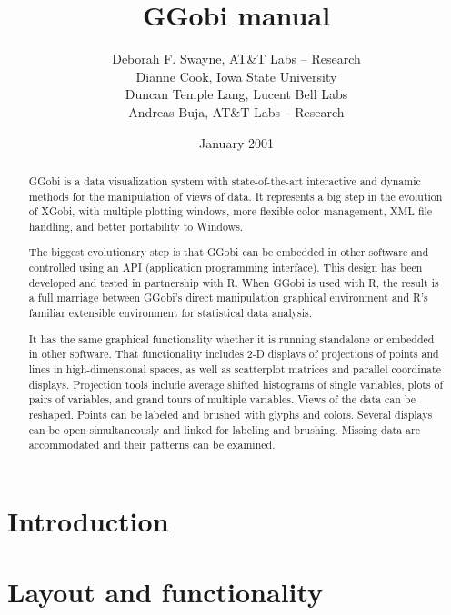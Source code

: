 \documentclass[11pt]{article}
\begin{document}
\title {GGobi manual}
\author{
Deborah F. Swayne, AT\&T Labs -- Research \\
Dianne Cook, Iowa State University \\
Duncan Temple Lang, Lucent Bell Labs \\
Andreas Buja, AT\&T Labs -- Research
}
\date{January 2001}

\maketitle


\begin{abstract}

GGobi is a data visualization system with state-of-the-art
interactive and dynamic methods for the manipulation of views of
data.  It represents a big step in the evolution of XGobi, with
multiple plotting windows, more flexible color management, XML file
handling, and better portability to Windows.

The biggest evolutionary step is that GGobi can be embedded in other
software and controlled using an API (application programming
interface).  This design has been developed and tested in partnership
with R.  When GGobi is used with R, the result is a full marriage
between GGobi's direct manipulation graphical environment and R's
familiar extensible environment for statistical data analysis.

It has the same graphical functionality whether it is running
standalone or embedded in other software.  That functionality
includes 2-D displays of projections of points and lines in
high-dimensional spaces, as well as scatterplot matrices and parallel
coordinate displays.  Projection tools include average shifted
histograms of single variables, plots of pairs of variables, and
grand tours of multiple variables.  Views of the data can be
reshaped.  Points can be labeled and brushed with glyphs and colors.
Several displays can be open simultaneously and linked for labeling
and brushing.  Missing data are accommodated and their patterns can
be examined.
\end{abstract}

\section{Introduction}

\section{Layout and functionality}
\end{document}
